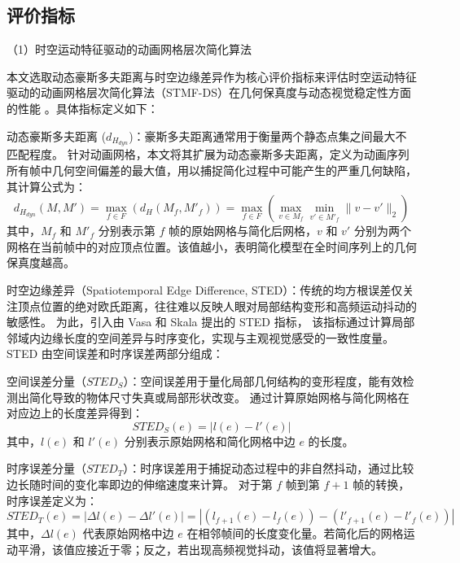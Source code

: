 \subsection{评价指标}

（1）时空运动特征驱动的动画网格层次简化算法

本文选取动态豪斯多夫距离与时空边缘差异作为核心评价指标来评估时空运动特征驱动的动画网格层次简化算法（STMF-DS）在几何保真度与动态视觉稳定性方面的性能
。具体指标定义如下：

动态豪斯多夫距离 ($d_{H_{dyn}}$)：豪斯多夫距离通常用于衡量两个静态点集之间最大不匹配程度\cite{4-3-2-1}。
针对动画网格，本文将其扩展为动态豪斯多夫距离，定义为动画序列所有帧中几何空间偏差的最大值，用以捕捉简化过程中可能产生的严重几何缺陷，其计算公式为：
\begin{equation}
d_{H_{dyn}}(M, M') = \max_{f \in F} \left( d_H(M_f, M'_f) \right) = \max_{f \in F} \left( \max_{v \in M_f} \min_{v' \in M'_f} \| v - v' \|_2 \right)
\end{equation}
其中，$M_f$ 和 $M'_f$ 分别表示第 $f$ 帧的原始网格与简化后网格，$v$ 和 $v'$ 分别为两个网格在当前帧中的对应顶点位置。该值越小，表明简化模型在全时间序列上的几何保真度越高。

时空边缘差异（Spatiotemporal Edge Difference, STED）：传统的均方根误差仅关注顶点位置的绝对欧氏距离，往往难以反映人眼对局部结构变形和高频运动抖动的敏感性。
为此，引入由 Vasa 和 Skala 提出的 STED 指标\cite{4-3-2-2}，
该指标通过计算局部邻域内边缘长度的空间差异与时序变化，实现与主观视觉感受的一致性度量。STED 由空间误差和时序误差两部分组成：

空间误差分量（$STED_S$）：空间误差用于量化局部几何结构的变形程度，能有效检测出简化导致的物体尺寸失真或局部形状改变。
通过计算原始网格与简化网格在对应边上的长度差异得到：
\begin{equation}
STED_S(e) = | l(e) - l'(e) |
\end{equation}
其中，$l(e)$ 和 $l'(e)$ 分别表示原始网格和简化网格中边 $e$ 的长度。

时序误差分量（$STED_T$）：时序误差用于捕捉动态过程中的非自然抖动，通过比较边长随时间的变化率即边的伸缩速度来计算。
对于第 $f$ 帧到第 $f+1$ 帧的转换，时序误差定义为：
\begin{equation}
STED_T(e) = | \Delta l(e) - \Delta l'(e) | = | (l_{f+1}(e) - l_f(e)) - (l'_{f+1}(e) - l'_f(e)) |
\end{equation}
其中，$\Delta l(e)$ 代表原始网格中边 $e$ 在相邻帧间的长度变化量。若简化后的网格运动平滑，该值应接近于零；反之，若出现高频视觉抖动，该值将显著增大。

